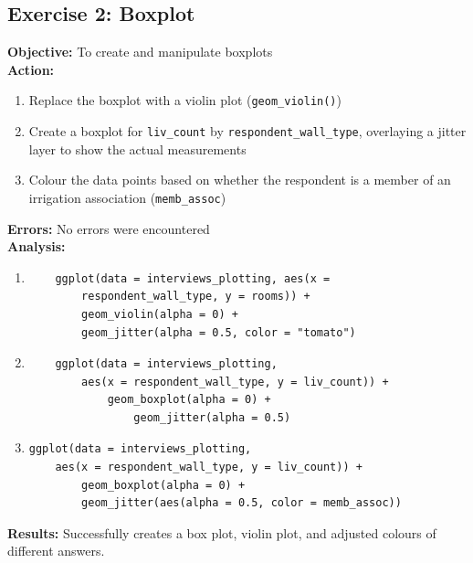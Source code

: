 \documentclass{article}
\begin{document}
\subsection{Exercise 2: Boxplot}
\textbf{Objective:} To create and manipulate boxplots\\
\textbf{Action:}
\begin{enumerate}
    \item Replace the boxplot with a violin plot (\verb|geom_violin()|)
    \item Create a boxplot for \verb|liv_count| by \verb|respondent_wall_type|, overlaying a jitter layer to show the actual measurements
    \item Colour the data points based on whether the respondent is a member of an irrigation association (\verb|memb_assoc|)
\end{enumerate}
\textbf{Errors:} No errors were encountered\\
\textbf{Analysis:}
\begin{enumerate}
    \item \begin{verbatim}
    ggplot(data = interviews_plotting, aes(x = 
        respondent_wall_type, y = rooms)) +
        geom_violin(alpha = 0) + 
        geom_jitter(alpha = 0.5, color = "tomato")
    \end{verbatim}
    \item \begin{verbatim}
    ggplot(data = interviews_plotting, 
        aes(x = respondent_wall_type, y = liv_count)) + 
            geom_boxplot(alpha = 0) + 
                geom_jitter(alpha = 0.5)
    \end{verbatim}
    \item \begin{verbatim}
ggplot(data = interviews_plotting, 
    aes(x = respondent_wall_type, y = liv_count)) + 
        geom_boxplot(alpha = 0) + 
        geom_jitter(aes(alpha = 0.5, color = memb_assoc))
    \end{verbatim}
\end{enumerate}
\textbf{Results:} Successfully creates a box plot, violin plot, and adjusted colours of different answers.

\end{document}
